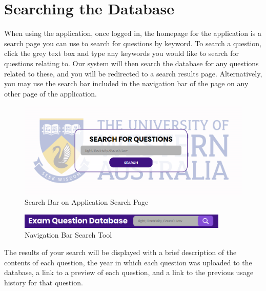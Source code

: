 \documentclass[12pt, a4paper, titlepage]{book}
\begin{document}
\section{Searching the Database}
When using the application, once logged in, the homepage for the application is a search page you can use to search for questions by keyword. To search a question, click the grey text box and type any keywords you would like to search for questions relating to. Our system will then search the database for any questions related to these, and you will be redirected to a search results page. Alternatively, you may use the search bar included in the navigation bar of the page on any other page of the application.
\begin{figure}[htp]
\centering
\includegraphics[width =12cm]{SearchPage.PNG}
\caption{Search Bar on Application Search Page}
\end{figure}
\begin{figure}[htp]
\centering
\includegraphics[width =10cm]{PagetopSearch.PNG}
\caption{Navigation Bar Search Tool}
\end{figure}

The results of your search will be displayed with a brief description of the contents of each question, the year in which each question was uploaded to the database, a link to a preview of each question, and a link to the previous usage history for that question.
\end{document}

